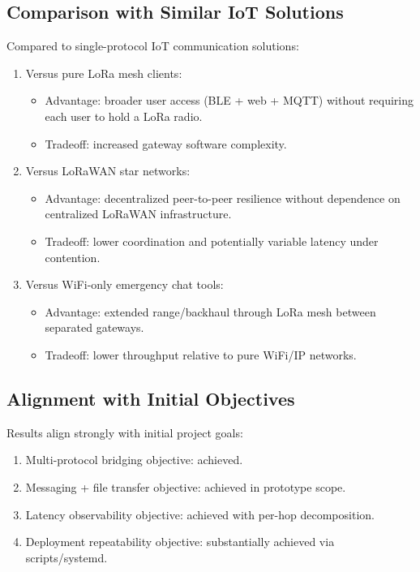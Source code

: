 \documentclass[conference]{IEEEtran}
\begin{document}
\subsection{Comparison with Similar IoT Solutions}
Compared to single-protocol IoT communication solutions:
\begin{enumerate}
\item Versus pure LoRa mesh clients:
\begin{itemize}
\item Advantage: broader user access (BLE + web + MQTT) without requiring each user to hold a LoRa radio.
\item Tradeoff: increased gateway software complexity.
\end{itemize}
\item Versus LoRaWAN star networks:
\begin{itemize}
\item Advantage: decentralized peer-to-peer resilience without dependence on centralized LoRaWAN infrastructure.
\item Tradeoff: lower coordination and potentially variable latency under contention.
\end{itemize}
\item Versus WiFi-only emergency chat tools:
\begin{itemize}
\item Advantage: extended range/backhaul through LoRa mesh between separated gateways.
\item Tradeoff: lower throughput relative to pure WiFi/IP networks.
\end{itemize}
\end{enumerate}

\subsection{Alignment with Initial Objectives}
Results align strongly with initial project goals:
\begin{enumerate}
\item Multi-protocol bridging objective: achieved.
\item Messaging + file transfer objective: achieved in prototype scope.
\item Latency observability objective: achieved with per-hop decomposition.
\item Deployment repeatability objective: substantially achieved via scripts/systemd.
\end{enumerate}
\end{document}
